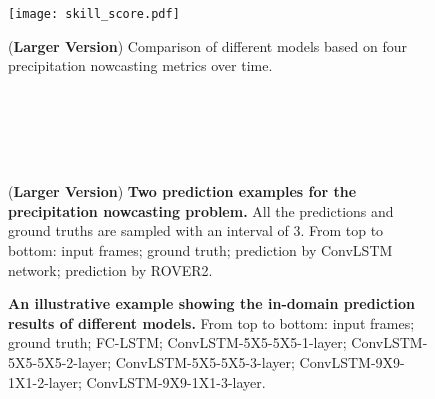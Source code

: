 \documentclass{article} \usepackage{amsmath}
\begin{document}
\begin{figure}[!h]
\centering
\texttt{[image: skill\_score.pdf]}
\caption{(\textbf{Larger Version}) Comparison of different models based on four precipitation nowcasting metrics over time.}
\vspace{-1em}
\end{figure}
\begin{figure}[!h]
\centering
{}
\\\vspace{-1em}
\\\vspace{-1em}
\\\vspace{-1em}
\\\caption{(\textbf{Larger Version}) \textbf{Two prediction examples for the precipitation nowcasting problem.} All the predictions and ground truths are sampled with an interval of 3. From top to bottom: input frames; ground truth; prediction by ConvLSTM network; prediction by ROVER2. }
\end{figure}

\begin{figure}[!h]
\centering
{}\vspace{-1em}
\vspace{-1em}
\vspace{-1em}
\vspace{-1em}
\vspace{-1em}
\vspace{-1em}
\vspace{-1em}
\caption{\textbf{An illustrative example showing the in-domain prediction results of different models.} From top to bottom: input frames; ground truth; FC-LSTM; ConvLSTM-5X5-5X5-1-layer; ConvLSTM-5X5-5X5-2-layer; ConvLSTM-5X5-5X5-3-layer; ConvLSTM-9X9-1X1-2-layer; ConvLSTM-9X9-1X1-3-layer.}
\label{fig:movingmnist-indomain}
\end{figure}
\end{document}
